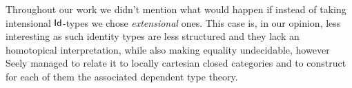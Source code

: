 \noindent
Throughout our work we didn't mention what would happen if instead of taking
intensional $\operatorname{\mathsf{Id}}$-types we chose \emph{extensional} ones. This case is, in our
opinion, less interesting as such identity types are less structured and they
lack an homotopical interpretation, while also making equality undecidable,
however Seely \cite{See84} managed to relate it to locally cartesian closed
categories and to construct for each of them the associated dependent type
theory.
